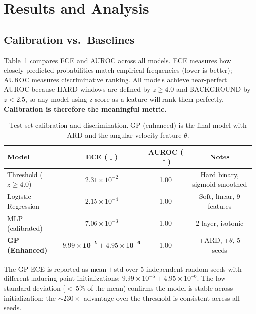 \documentclass{article}
\begin{document}
\section{Results and Analysis}

\subsection{Calibration vs.\ Baselines}

Table~\ref{tab:ece} compares ECE and AUROC across all models.
ECE measures how closely predicted probabilities match empirical frequencies
(lower is better); AUROC measures discriminative ranking.
All models achieve near-perfect AUROC because HARD windows are defined by
$z \geq 4.0$ and BACKGROUND by $z < 2.5$, so any model using z-score as a
feature will rank them perfectly.
\textbf{Calibration is therefore the meaningful metric.}

\begin{table}[h]
\centering
\caption{Test-set calibration and discrimination. GP (enhanced) is the final
model with ARD and the angular-velocity feature $\dot{\theta}$.}
\label{tab:ece}
\begin{tabular}{lccc}
\toprule
Model & ECE ($\downarrow$) & AUROC ($\uparrow$) & Notes \\
\midrule
Threshold ($z \geq 4.0$)   & $2.31\times10^{-2}$              & 1.00 & Hard binary, sigmoid-smoothed \\
Logistic Regression         & $2.15\times10^{-4}$  & 1.00 & Soft, linear, 9 features \\
MLP (calibrated)            & $7.06\times10^{-3}$  & 1.00 & 2-layer, isotonic \\
\textbf{GP (Enhanced)}      & $\mathbf{9.99\!\times\!10^{-5} \pm 4.95\!\times\!10^{-6}}$ & 1.00 & +ARD, +$\dot{\theta}$, 5 seeds \\
\bottomrule
\end{tabular}
\end{table}

The GP ECE is reported as mean\,$\pm$\,std over 5 independent random seeds
with different inducing-point initializations: $9.99\times10^{-5} \pm 4.95\times10^{-6}$.
The low standard deviation ($<$\,5\% of the mean) confirms the model is stable
across initialization; the $\sim\!230\times$ advantage over the threshold
is consistent across all seeds.
\end{document}
